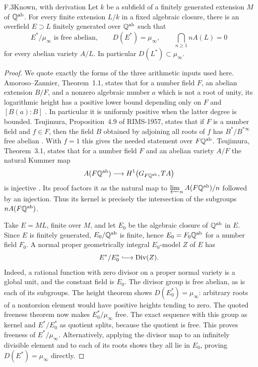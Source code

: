 \begin{claim}{F.3}{Known, with derivation}
Let $k$ be a subfield of a finitely generated extension $M$ of
$\mathbb Q^{\mathrm{ab}}$. For every finite extension $L/k$ in a fixed
algebraic closure, there is an overfield $E\supset L$ finitely
generated over $\mathbb Q^{\mathrm{ab}}$ such that
\[
 E^*/\mu_\infty\text{ is free abelian},\qquad
 D(E^*)=\mu_\infty,
 \qquad \bigcap_{n\ge1}n A(L)=0
\]
for every abelian variety $A/L$. In particular
$D(L^*)\subset\mu_\infty$.
\end{claim}
\begin{proof}
We quote exactly the forms of the three arithmetic inputs used here.
Amoroso--Zannier, Theorem~1.1, states that for a number field $F$, an
abelian extension $B/F$, and a nonzero algebraic number $a$ which is not
a root of unity, its logarithmic height has a positive lower bound
depending only on $F$ and $[B(a):B]$ \citep{F_AZ2000}. In particular
it is uniformly positive when the latter degree is bounded. Tsujimura,
Proposition~4.9 of RIMS-1957, states that if $F$ is a number field and
$f\in F$, then the field $B$ obtained by adjoining all roots of $f$
has $B^*/B^{*\infty}$ free abelian \citep{F_Tsu2022}. With $f=1$
this gives the needed statement over $F\mathbb Q^{\mathrm{ab}}$.
Tsujimura, Theorem~3.1, states that for a number field $F$ and an
abelian variety $A/F$ the natural Kummer map
\[
A(F\mathbb Q^{\mathrm{ab}})\longrightarrow
H^1\bigl(G_{F\mathbb Q^{\mathrm{ab}}},T A\bigr)
\]
is injective \citep{F_Tsu2020}. Its proof factors it as the natural
map to $\varprojlim_n A(F\mathbb Q^{\mathrm{ab}})/n$ followed by an
injection. Thus its kernel is precisely the intersection of the
subgroups $nA(F\mathbb Q^{\mathrm{ab}})$.

Take $E=ML$, finite over $M$, and let $E_0$ be the algebraic closure
of $\mathbb Q^{\mathrm{ab}}$ in $E$. Since $E$ is finitely generated,
$E_0/\mathbb Q^{\mathrm{ab}}$ is finite, hence
$E_0=F_0\mathbb Q^{\mathrm{ab}}$ for a number field $F_0$. A normal proper
geometrically integral $E_0$-model $Z$ of $E$ has
\[
 E^*/E_0^*\lhook\joinrel\longrightarrow
 \operatorname{Div}(Z).
\]
Indeed, a rational function with zero divisor on a proper normal
variety is a global unit, and the constant field is $E_0$.
The divisor group is free abelian, as is each of its subgroups.
The height theorem shows $D(E_0^*)=\mu_\infty$: arbitrary roots of
a nontorsion element would have positive heights tending to zero.
The quoted freeness theorem now makes $E_0^*/\mu_\infty$ free.
The exact sequence with this group as kernel and $E^*/E_0^*$ as
quotient splits, because the quotient is free. This proves freeness
of $E^*/\mu_\infty$. Alternatively, applying the divisor map to an
infinitely divisible element and to each of its roots shows they all
lie in $E_0$, proving $D(E^*)=\mu_\infty$ directly.


\end{proof}
